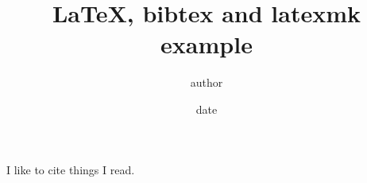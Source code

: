 \documentclass[11pt]{report}
\title{\LaTeX, bibtex and latexmk example}
\date{date}
\author{author}
\begin{document}
\maketitle

I like to cite things I read\cite{MyBookILikeToCite}.



\end{document}
